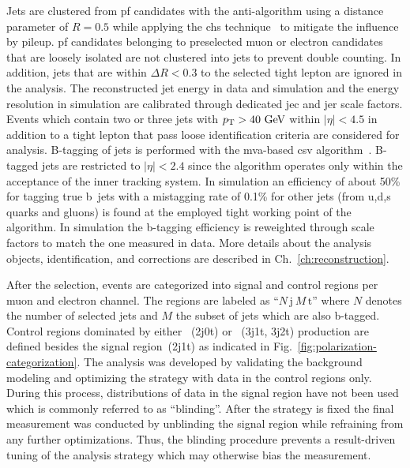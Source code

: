 Jets are clustered from \gls{pf} candidates with the anti-\kt algorithm using a distance parameter of $R=0.5$ while applying the \gls{chs} technique~\cite{CMS-PAS-JME-14-001} to mitigate the influence by pileup. \gls{pf} candidates belonging to preselected muon or electron candidates that are loosely isolated are not clustered into jets to prevent double counting. In addition, jets that are within $\Delta R<0.3$ to the selected tight lepton are ignored in the analysis. The reconstructed jet energy in data and simulation and the energy resolution in simulation are calibrated through dedicated \gls{jec} and \gls{jer} scale factors. Events which contain two or three jets with $p_\textrm{T}>40~\textrm{GeV}$ within $|\eta|<4.5$ in addition to a tight lepton that pass loose identification criteria are considered for analysis. B-tagging of jets is performed with the \gls{mva}-based \gls{csv} algorithm~\cite{Chatrchyan:2012jua}. B-tagged jets are restricted to $|\eta|<2.4$ since the algorithm operates only within the acceptance of the inner tracking system. In simulation an efficiency of about 50\% for tagging true b~jets with a mistagging rate of 0.1\% for other jets (from u,d,s quarks and gluons) is found at the employed tight working point of the algorithm. In simulation the b-tagging efficiency is reweighted through scale factors to match the one measured in data. More details about the analysis objects, identification, and corrections are described in Ch.~\ref{ch:reconstruction}.

After the selection, events are categorized into signal and control regions per muon and electron channel. The regions are labeled as ``$N\,\mathrm{j}~M\,\mathrm{t}$'' where $N$ denotes the number of selected jets and $M$ the subset of jets which are also b-tagged. Control regions dominated by either \wjets~(2j0t) or \ttbar~(3j1t, 3j2t) production are defined besides the signal region~(2j1t) as indicated in Fig.~\ref{fig:polarization-categorization}. The analysis was developed by validating the background modeling and optimizing the strategy with data in the control regions only. During this process, distributions of data in the signal region have not been used which is commonly referred to as ``blinding''. After the strategy is fixed the final measurement was conducted by unblinding the signal region while refraining from any further optimizations. Thus, the blinding procedure prevents a result-driven tuning of the analysis strategy which may otherwise bias the measurement.

